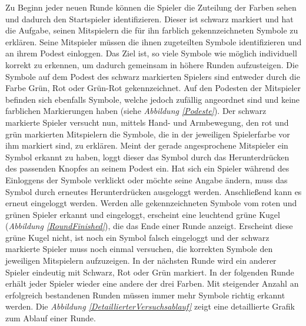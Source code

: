 \documentclass[a4paper,11pt]{article}%
\renewcommand{\\}{\vspace*{0.5\baselineskip} \newline}
\begin{document}
Zu Beginn jeder neuen Runde können die Spieler die Zuteilung der Farben sehen und dadurch den Startspieler identifizieren. Dieser ist schwarz markiert und hat die Aufgabe, seinen Mitspielern die für ihn farblich gekennzeichneten Symbole zu erklären. Seine Mitspieler müssen die ihnen zugeteilten Symbole identifizieren und an ihrem Podest einloggen. Das Ziel ist, so viele Symbole wie möglich individuell korrekt zu erkennen, um dadurch gemeinsam in höhere Runden aufzusteigen.
Die Symbole auf dem Podest des schwarz markierten Spielers sind entweder durch die Farbe Grün, Rot oder Grün-Rot gekennzeichnet. Auf den Podesten der Mitspieler befinden sich ebenfalls Symbole, welche jedoch zufällig angeordnet sind und keine farblichen Markierungen haben (siehe \textit{Abbildung \ref{Podeste}}). Der schwarz markierte Spieler versucht nun, mittels Hand- und Armbewegung, den rot und grün markierten Mitspielern die Symbole, die in der jeweiligen Spielerfarbe vor ihm markiert sind, zu erklären. Meint der gerade angesprochene Mitspieler ein Symbol erkannt zu haben, loggt dieser das Symbol durch das Herunterdrücken des passenden Knopfes an seinem Podest ein. Hat sich ein Spieler während des Einloggens der Symbole verklickt oder möchte seine Angabe ändern, muss das Symbol durch erneutes Herunterdrücken ausgeloggt werden. Anschließend kann es erneut eingeloggt werden. Werden alle gekennzeichneten Symbole vom roten und grünen Spieler erkannt und eingeloggt, erscheint eine leuchtend grüne Kugel (\textit{Abbildung \ref{RoundFinished}}), die das Ende einer Runde anzeigt. Erscheint diese grüne Kugel nicht, ist noch ein Symbol falsch eingeloggt und der schwarz markierte Spieler muss noch einmal versuchen, die korrekten Symbole den jeweiligen Mitspielern aufzuzeigen. 
In der nächsten Runde wird ein anderer Spieler eindeutig mit Schwarz, Rot oder Grün markiert.
In der folgenden Runde erhält jeder Spieler wieder eine andere der drei Farben. Mit steigender Anzahl an erfolgreich bestandenen Runden müssen immer mehr Symbole richtig erkannt werden. 
Die \textit{Abbildung \ref{DetaillierterVersuchsablauf}} zeigt eine detaillierte Grafik zum Ablauf einer Runde.
\end{document}
